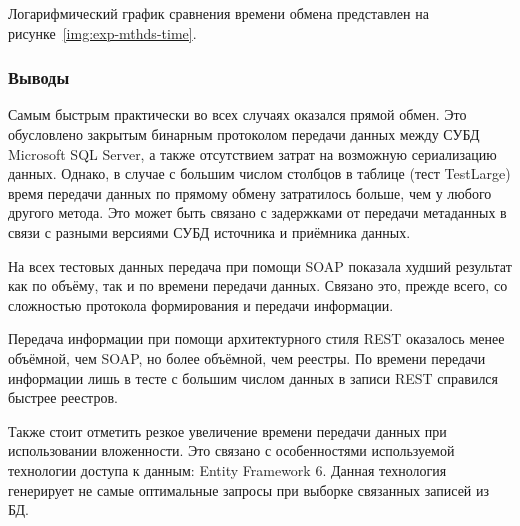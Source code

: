 Логарифмический график сравнения времени обмена представлен на рисунке~\ref{img:exp-mthds-time}.



\subsubsection*{Выводы}

Самым быстрым практически во всех случаях оказался прямой обмен.
Это обусловлено закрытым бинарным протоколом передачи данных между СУБД Microsoft SQL Server, а также отсутствием затрат на возможную сериализацию данных.
Однако, в случае с большим числом столбцов в таблице (тест TestLarge) время передачи данных по прямому обмену затратилось больше, чем у любого другого метода.
Это может быть связано с задержками от передачи метаданных в связи с разными версиями СУБД источника и приёмника данных.

На всех тестовых данных передача при помощи SOAP показала худший результат как по объёму, так и по времени передачи данных.
Связано это, прежде всего, со сложностью протокола формирования и передачи информации.

Передача информации при помощи архитектурного стиля REST оказалось менее объёмной, чем SOAP, но более объёмной, чем реестры.
По времени передачи информации лишь в тесте с большим числом данных в записи REST справился быстрее реестров.

Также стоит отметить резкое увеличение времени передачи данных при использовании вложенности.
Это связано с особенностями используемой технологии доступа к данным: Entity Framework 6.
Данная технология генерирует не самые оптимальные запросы при выборке связанных записей из БД.

\clearpage
\newpage
